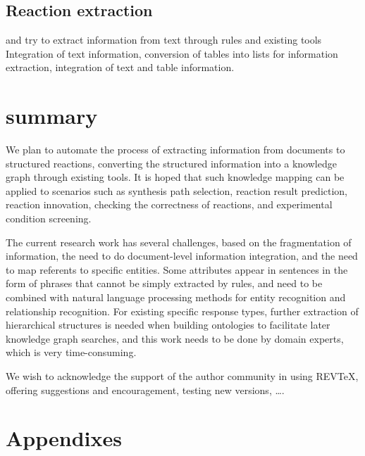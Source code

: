 \documentclass[%
 aip,
 jmp,%
 amsmath,amssymb,
 reprint,%
]{revtex4-2}
\begin{document}
\subsection{Reaction extraction}
and try to extract information from text through rules and existing tools
Integration of text information, conversion of tables into lists for information extraction, integration of text and table information.

\section{summary}
We plan to automate the process of extracting information from documents to structured reactions, converting the structured information 
into a knowledge graph through existing tools. It is hoped that such knowledge mapping can be applied to scenarios such as synthesis path
selection, reaction result prediction, reaction innovation, checking the correctness of reactions, and experimental condition screening.

The current research work has several challenges, based on the fragmentation of information, the need to do document-level information 
integration, and the need to map referents to specific entities. Some attributes appear in sentences in the form of phrases that cannot 
be simply extracted by rules, and need to be combined with natural language processing methods for entity recognition and relationship 
recognition. For existing specific response types, further extraction of hierarchical structures is needed when building ontologies to 
facilitate later knowledge graph searches, and this work needs to be done by domain experts, which is very time-consuming.

\begin{acknowledgments}
We wish to acknowledge the support of the author community in using
REV\TeX{}, offering suggestions and encouragement, testing new versions,
\dots.
\end{acknowledgments}

\appendix

\section{Appendixes}
\end{document}
